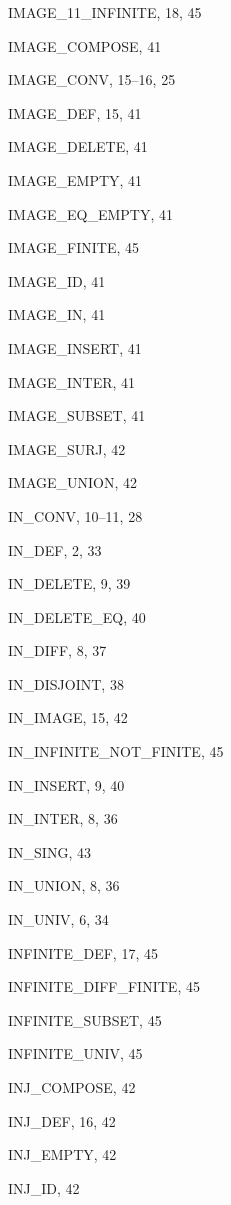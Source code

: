 \begin{theindex}
  \item {\ptt IMAGE\_11\_INFINITE}, 18, 45
  \item {\ptt IMAGE\_COMPOSE}, 41
  \item {\ptt IMAGE\_CONV}, 15--16, 25
  \item {\ptt IMAGE\_DEF}, 15, 41
  \item {\ptt IMAGE\_DELETE}, 41
  \item {\ptt IMAGE\_EMPTY}, 41
  \item {\ptt IMAGE\_EQ\_EMPTY}, 41
  \item {\ptt IMAGE\_FINITE}, 45
  \item {\ptt IMAGE\_ID}, 41
  \item {\ptt IMAGE\_IN}, 41
  \item {\ptt IMAGE\_INSERT}, 41
  \item {\ptt IMAGE\_INTER}, 41
  \item {\ptt IMAGE\_SUBSET}, 41
  \item {\ptt IMAGE\_SURJ}, 42
  \item {\ptt IMAGE\_UNION}, 42
  \item {\ptt IN\_CONV}, 10--11, 28
  \item {\ptt IN\_DEF}, 2, 33
  \item {\ptt IN\_DELETE}, 9, 39
  \item {\ptt IN\_DELETE\_EQ}, 40
  \item {\ptt IN\_DIFF}, 8, 37
  \item {\ptt IN\_DISJOINT}, 38
  \item {\ptt IN\_IMAGE}, 15, 42
  \item {\ptt IN\_INFINITE\_NOT\_FINITE}, 45
  \item {\ptt IN\_INSERT}, 9, 40
  \item {\ptt IN\_INTER}, 8, 36
  \item {\ptt IN\_SING}, 43
  \item {\ptt IN\_UNION}, 8, 36
  \item {\ptt IN\_UNIV}, 6, 34
  \item {\ptt INFINITE\_DEF}, 17, 45
  \item {\ptt INFINITE\_DIFF\_FINITE}, 45
  \item {\ptt INFINITE\_SUBSET}, 45
  \item {\ptt INFINITE\_UNIV}, 45
  \item {\ptt INJ\_COMPOSE}, 42
  \item {\ptt INJ\_DEF}, 16, 42
  \item {\ptt INJ\_EMPTY}, 42
  \item {\ptt INJ\_ID}, 42

\end{theindex}
